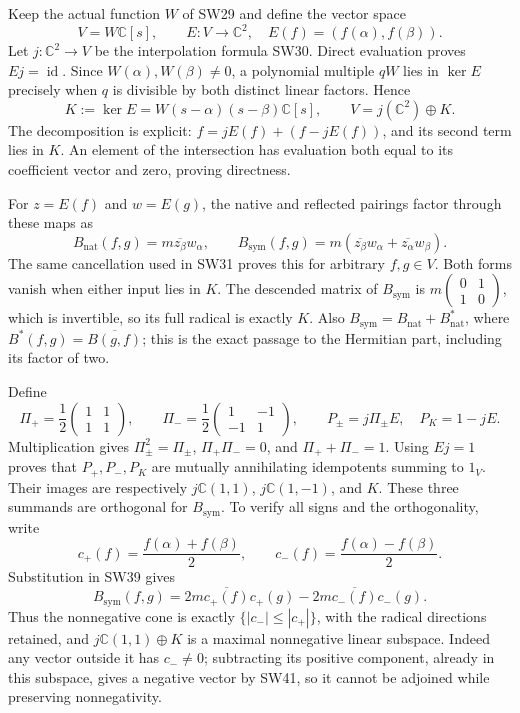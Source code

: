 \documentclass[
  10pt,
  a4paper,
]{article}
\begin{document}
Keep the actual function \(W\) of SW29 and define the vector space \[
V=W\mathbb C[s],\qquad
E:V\longrightarrow\mathbb C^2,\quad E(f)=(f(\alpha),f(\beta)).
\tag{SW37}
\] Let \(j:\mathbb C^2\to V\) be the interpolation formula SW30. Direct
evaluation proves \(Ej=\operatorname{id}\). Since
\(W(\alpha),W(\beta)\ne0\), a polynomial multiple \(qW\) lies in
\(\ker E\) precisely when \(q\) is divisible by both distinct linear
factors. Hence \[
K:=\ker E=W(s-\alpha)(s-\beta)\mathbb C[s],\qquad
V=j(\mathbb C^2)\oplus K.
\tag{SW38}
\] The decomposition is explicit: \(f=jE(f)+(f-jE(f))\), and its second
term lies in \(K\). An element of the intersection has evaluation both
equal to its coefficient vector and zero, proving directness.

For \(z=E(f)\) and \(w=E(g)\), the native and reflected pairings factor
through these maps as \[
B_{\mathrm{nat}}(f,g)=m\overline{z_\beta}w_\alpha,\qquad
B_{\mathrm{sym}}(f,g)=m(\overline{z_\beta}w_\alpha+\overline{z_\alpha}w_\beta).
\tag{SW39}
\] The same cancellation used in SW31 proves this for arbitrary
\(f,g\in V\). Both forms vanish when either input lies in \(K\). The
descended matrix of \(B_{\mathrm{sym}}\) is
\(m\left(\begin{smallmatrix}0&1\\1&0\end{smallmatrix}\right)\), which is
invertible, so its full radical is exactly \(K\). Also
\(B_{\mathrm{sym}}=B_{\mathrm{nat}}+B_{\mathrm{nat}}^{*}\), where
\(B^*(f,g)=\overline{B(g,f)}\); this is the exact passage to the
Hermitian part, including its factor of two.

Define \[
\Pi_+=\frac12\begin{pmatrix}1&1\\1&1\end{pmatrix},\qquad
\Pi_-=\frac12\begin{pmatrix}1&-1\\-1&1\end{pmatrix},\qquad
P_\pm=j\Pi_\pm E,\quad P_K=1-jE.
\tag{SW40}
\] Multiplication gives \(\Pi_\pm^2=\Pi_\pm\), \(\Pi_+\Pi_-=0\), and
\(\Pi_++\Pi_-=1\). Using \(Ej=1\) proves that \(P_+,P_-,P_K\) are
mutually annihilating idempotents summing to \(1_V\). Their images are
respectively \(j\mathbb C(1,1)\), \(j\mathbb C(1,-1)\), and \(K\). These
three summands are orthogonal for \(B_{\mathrm{sym}}\). To verify all
signs and the orthogonality, write \[
c_+(f)=\frac{f(\alpha)+f(\beta)}2,\qquad
c_-(f)=\frac{f(\alpha)-f(\beta)}2.
\] Substitution in SW39 gives \[
B_{\mathrm{sym}}(f,g)=2m\overline{c_+(f)}c_+(g)
-2m\overline{c_-(f)}c_-(g).
\tag{SW41}
\] Thus the nonnegative cone is exactly \(\{|c_-|\le|c_+|\}\), with the
radical directions retained, and \(j\mathbb C(1,1)\oplus K\) is a
maximal nonnegative linear subspace. Indeed any vector outside it has
\(c_-\ne0\); subtracting its positive component, already in this
subspace, gives a negative vector by SW41, so it cannot be adjoined
while preserving nonnegativity.
\end{document}
